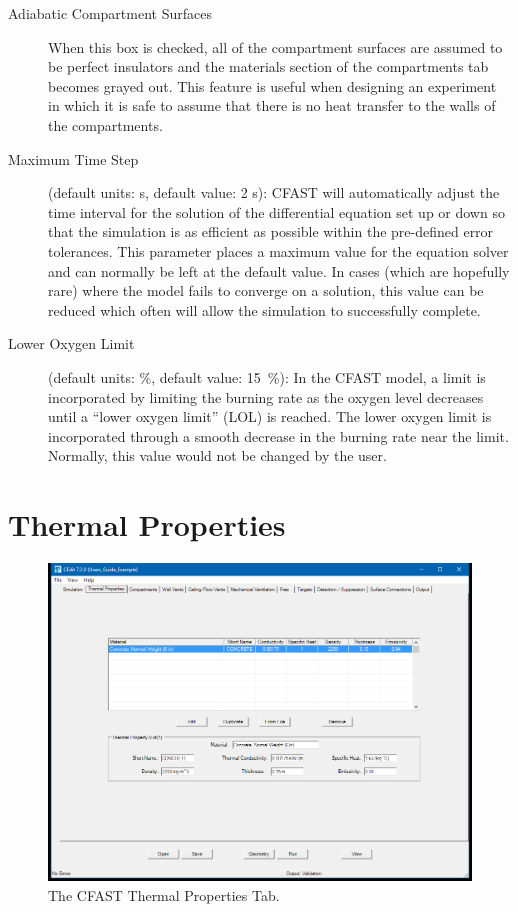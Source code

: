 \begin{description}
\item[Adiabatic Compartment Surfaces] When this box is checked, all of the compartment surfaces are assumed to be perfect insulators and the materials section of the compartments tab becomes grayed out. This feature is useful when designing an experiment in which it is safe to assume that there is no heat transfer to the walls of the compartments.

\item[Maximum Time Step] (default units: s, default value: 2 s): CFAST will automatically adjust the time interval for the solution of the differential equation set up or down so that the simulation is as efficient as possible within the pre-defined error tolerances. This parameter places a maximum value for the equation solver and can normally be left at the default value. In cases (which are hopefully rare) where the model fails to converge on a solution, this value can be reduced which often will allow the simulation to successfully complete.

\item[Lower Oxygen Limit] (default units: \%, default value: 15~\%):  In the CFAST model, a limit is incorporated by limiting the burning rate as the oxygen level decreases until a ``lower oxygen limit'' (LOL) is reached. The lower oxygen limit is incorporated through a smooth decrease in the burning rate near the limit. Normally, this value would not be changed by the user.
\end{description}





\chapter{Thermal Properties}

\begin{figure}[ht]
\centering
\includegraphics[width=6.5in]{FIGURES/Thermal_Properties_Tab}
\caption[The CFAST Thermal Properties Tab]{The CFAST Thermal Properties Tab.}
\end{figure}

